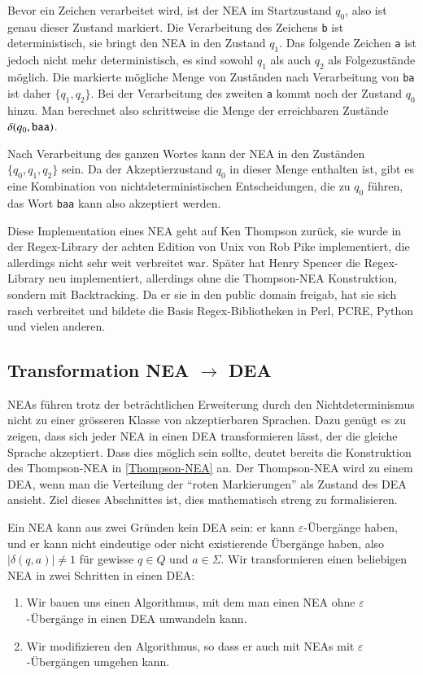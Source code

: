 Bevor ein Zeichen verarbeitet wird,
ist der NEA im Startzustand $q_0$, also ist genau dieser Zustand
markiert.
Die Verarbeitung des Zeichens {\tt b} ist deterministisch,
sie bringt den NEA in den Zustand $q_1$.
Das folgende Zeichen {\tt a}
ist jedoch nicht mehr deterministisch, es sind sowohl $q_1$ als auch
$q_2$ als Folgezustände möglich.
Die markierte mögliche Menge von Zuständen nach Verarbeitung von {\tt ba}
ist daher $\{q_1,q_2\}$.
Bei der Verarbeitung des zweiten {\tt a} kommt noch der Zustand $q_0$ hinzu.
Man berechnet also schrittweise die
Menge der erreichbaren Zustände $\delta(q_0,{\tt baa})$.

Nach Verarbeitung des ganzen Wortes kann der NEA in den Zuständen
$\{q_0,q_1,q_2\}$ sein.
Da der Akzeptierzustand $q_0$ in dieser Menge
enthalten ist, gibt es eine Kombination von nichtdeterministischen
Entscheidungen, die zu $q_0$ führen, das Wort {\tt baa} kann also
akzeptiert werden.

Diese Implementation eines NEA geht auf Ken Thompson zurück, sie wurde in
der Regex-Library der achten Edition von Unix von Rob Pike
 implementiert, die allerdings nicht sehr weit
verbreitet war.
Später hat Henry Spencer die Regex-Library neu
implementiert, allerdings ohne die Thompson-NEA Konstruktion, sondern
mit Backtracking.
Da er sie in den public domain freigab, hat sie sich
rasch verbreitet und bildete die Basis Regex-Bibliotheken in Perl, PCRE,
Python und vielen anderen.

\subsection{Transformation NEA \texorpdfstring{$\rightarrow$}{->} DEA\label{regulaer:nea-dea}}
NEAs führen trotz der beträchtlichen Erweiterung durch den
Nichtdeterminismus nicht zu einer grösseren Klasse von akzeptierbaren
Sprachen.
Dazu genügt es zu zeigen, dass sich jeder NEA in einen DEA
transformieren lässt, der die gleiche Sprache akzeptiert.
Dass dies möglich sein sollte, deutet bereits die Konstruktion
des Thompson-NEA in \ref{Thompson-NEA} an.
Der Thompson-NEA wird zu einem DEA, wenn man die Verteilung der
``roten Markierungen'' als Zustand des DEA ansieht.
Ziel dieses Abschnittes ist, dies
mathematisch streng zu formalisieren.

Ein NEA kann aus zwei Gründen kein DEA sein:
er kann $\varepsilon$-Übergänge haben, und er kann nicht eindeutige
oder nicht existierende Übergänge haben, also $|\delta(q,a)|\ne 1$
für gewisse $q\in Q$ und $a\in\Sigma$.
Wir transformieren einen 
beliebigen NEA in zwei Schritten in einen DEA:
\begin{enumerate}
\item Wir bauen uns einen Algorithmus, mit dem man einen NEA ohne
$\varepsilon$-Übergänge in einen DEA umwandeln kann.
\item Wir modifizieren den Algorithmus, so dass er auch mit NEAs mit
$\varepsilon$-Übergängen umgehen kann.
\end{enumerate}

